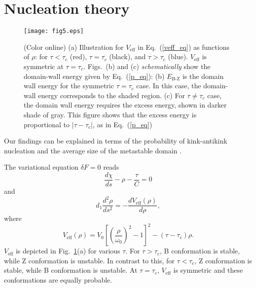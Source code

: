 \documentclass[pre,showpacs,twocolumn,superscriptaddress]{revtex4}
\begin{document}
\section{Nucleation theory\label{nucl_sec}}
\begin{figure*}[t]
\texttt{[image: fig5.eps]}\\
\caption{(Color online) 
(a) 
Illustration for
$V_\text{eff}$ in Eq.~(\ref{veff_eq}) as functions of  $\rho$:
for $\tau<\tau_c$ (red),
$\tau =\tau_c$ (black),
and
$\tau >\tau_c$ (blue).
$V_\text{eff}$ is symmetric at $\tau=\tau_c$.
Figs.~(b) and (c) {\it schematically}  show 
the domain-wall energy given by Eq.~(\ref{p_eq}):
(b)
$E_{\text{B-Z}}$ is the domain wall energy 
for the symmetric $\tau=\tau_c$ case.
In this case, the domain-wall energy 
corresponds to the shaded region.
(c)
For $\tau \neq \tau_c$ case,
the domain wall energy requires the excess energy,
shown in darker shade of gray.
This figure shows that the excess energy is proportional to
 $|\tau-\tau_c|$,
as in Eq.~(\ref{p_eq})}
\label{veff}
\end{figure*}
Our findings can be explained in terms of
the probability of kink-antikink nucleation 
and the average size of the metastable domain \cite{Langer}.

The variational equation $\delta F=0$ 
reads
\begin{equation}
\frac{d \chi}{ds}-\rho-\frac{\tau}{C}=0
\end{equation}
and
\begin{equation}
d_1 \frac{d^2 \rho}{ds^2}=-\frac{d V_{\text{eff}}(\rho)}{d \rho},
\end{equation}
where
\begin{equation}
V_{\text{eff}}(\rho)=V_0\left[\left(\frac{\rho}{\omega_0}\right)^2-1\right]^2-(\tau-\tau_c)\rho.
\label{veff_eq}
\end{equation}
$V_\text{eff}$ is depicted in Fig.~\ref{veff}(a) for various $\tau$.
For $\tau>\tau_c$, B conformation is stable, while Z conformation is
unstable.
In contrast to this, for $\tau<\tau_c$, Z conformation is stable, while
B conformation is unstable.
At $\tau=\tau_c$,
$V_\text{eff}$ is symmetric and these conformations are equally probable.
\end{document}
